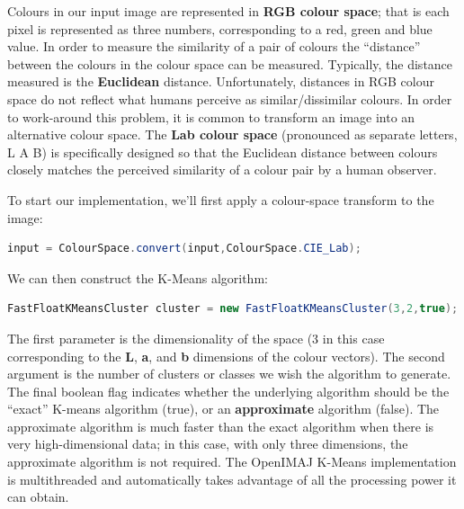 \documentclass[10pt,a4paper,twoside,extrafontsizes]{memoir}
\begin{document}
Colours in our input image are represented in \textbf{RGB colour space}; that is each pixel is 
represented as three numbers, corresponding to a red, green and blue value. In order 
to measure the similarity of a pair of colours the ``distance'' between the colours in 
the colour space can be measured.  Typically, the distance measured is the \textbf{Euclidean} 
distance. Unfortunately, distances in RGB colour space do not reflect what humans perceive as 
similar/dissimilar colours. In order to work-around this problem, it is common to transform 
an image into an alternative colour space. The \textbf{Lab colour space} (pronounced as 
separate letters, L A B) is specifically designed so that the Euclidean distance between 
colours closely matches the perceived similarity of a colour pair by a human observer.

\pagebreak
To start our implementation, we'll first apply a colour-space transform to the image:
\begin{lstlisting}[language=java]
input = ColourSpace.convert(input,ColourSpace.CIE_Lab);
\end{lstlisting}
We can then construct the K-Means algorithm:
\begin{lstlisting}[language=java]
FastFloatKMeansCluster cluster = new FastFloatKMeansCluster(3,2,true);
\end{lstlisting}
The first parameter is the dimensionality of the space (3 in this case corresponding 
to the \textbf{L}, \textbf{a}, and \textbf{b} dimensions of the colour vectors). The second 
argument is the number of clusters or classes we wish the algorithm to generate. The final 
boolean flag indicates whether the underlying algorithm should be the ``exact'' K-means algorithm (true), or an 
\textbf{approximate} algorithm (false). The approximate algorithm is much faster than the exact 
algorithm when there is very high-dimensional data; in this case, with only three dimensions, 
the approximate algorithm is not required. The OpenIMAJ K-Means implementation is 
multithreaded and automatically takes advantage of all the processing power it can obtain.
\end{document}
